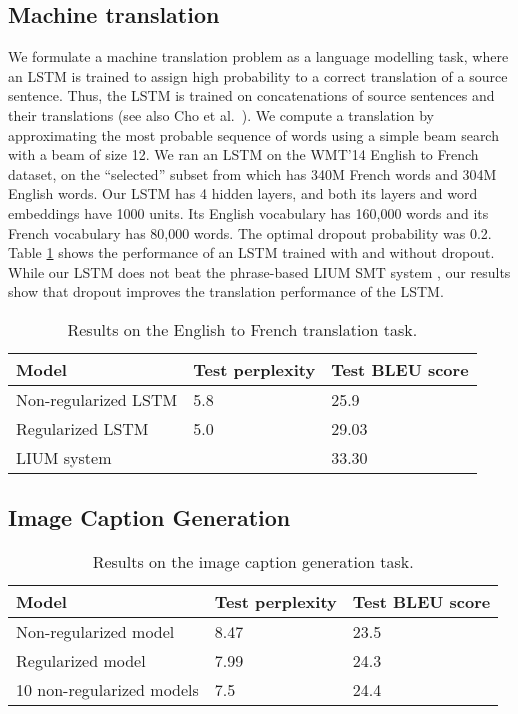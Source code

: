 \documentclass[twoside,11pt,a4paper]{article}
\begin{document}
	
	\subsection{Machine translation}
	\label{sec:trans}
	
	We formulate a machine translation problem as a language modelling task, where
	an LSTM is trained to assign high probability to a correct
	translation of a source sentence.  Thus, the LSTM is trained on
	concatenations of source sentences and their translations 
	\cite{sutskever2014sequence} (see also Cho et al.~\cite{cho2014learning}). We compute a translation by 
	approximating the most probable sequence of words
	using a simple beam search with a beam of size 12.  We ran an
	LSTM on the WMT'14 English to French dataset, on the
	``selected'' subset from \cite{wmt_joint} which has 340M French words
	and 304M English words.  Our LSTM has 4 hidden layers, and both its
	layers and word embeddings have 1000 units.  Its 
	English vocabulary has 160,000 words and its French vocabulary has
	80,000 words.  The optimal dropout probability was 0.2.
	Table \ref{tab:mt} shows the performance of an LSTM trained with and without dropout.
	While our LSTM does not beat the phrase-based LIUM SMT system
	\cite{lium}, our results show that dropout improves the
	translation performance of the LSTM.
	
	\begin{table}[t]
		\small
		\centering
		\renewcommand{\arraystretch}{1.15}
		\begin{tabular}{lll}
			\hline
			Model & Test perplexity & Test BLEU score \\
			\hline
			Non-regularized LSTM & 5.8 & 25.9 \\
			Regularized LSTM & 5.0 &  29.03 \\
			\hline
			LIUM system  &  &  33.30 \\
			\hline
		\end{tabular}
		\caption{Results on the English to French translation task. }
		\label{tab:mt}
	\end{table}
	
	\subsection{Image Caption Generation}
	\label{sec:caption}
	
	\begin{table}[th]
		\small
		\centering
		\renewcommand{\arraystretch}{1.15}
		\begin{tabular}{lll}
			\hline
			Model & Test perplexity & Test BLEU score \\
			\hline
			Non-regularized model & 8.47 & 23.5 \\
			Regularized model & 7.99 &  24.3 \\
			\hline
			10 non-regularized models  & 7.5  &  24.4 \\
			\hline
		\end{tabular}
		\caption{Results on the image caption generation task. }
		\label{tab:vis}
	\end{table}
	
	
	
\end{document}
